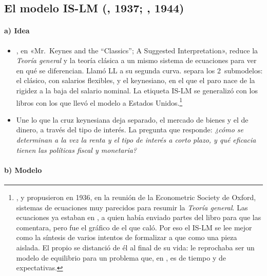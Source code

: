 \documentclass[11pt]{article}
\begin{document}
\subsection{El modelo IS-LM (, 1937; , 1944)}\label{sec:islm}

\paragraph{a) Idea}

\begin{itemize}
\item \textcite{Hicks1937Keynes}, en «Mr.~Keynes and the ``Classics''; A Suggested Interpretation», reduce la \emph{Teoría general} y la teoría clásica a un mismo sistema de ecuaciones para ver en qué se diferencian. Llamó LL a su segunda curva. \textcite{Modigliani1944Liquidity} separa los 2~submodelos: el clásico, con salarios flexibles, y el keynesiano, en el que el paro nace de la rigidez a la baja del salario nominal. La etiqueta IS-LM se generalizó con los libros con los que  llevó el modelo a Estados Unidos\nocite{Hansen1949Monetary,Hansen1953Guide}.\footnote{,  y  propusieron en 1936, en la reunión de la Econometric Society de Oxford, sistemas de ecuaciones muy parecidos para resumir la \emph{Teoría general}\nocite{Harrod1937Keynes,Meade1937Simplified,Hicks1937Keynes}. Las ecuaciones ya estaban en , a quien  había enviado partes del libro para que las comentara, pero fue el gráfico de  el que caló. Por eso el IS-LM se lee mejor como la síntesis de varios intentos de formalizar a  que como una pieza aislada\nocite{Fonseca2026ISLM,Young1987Interpreting}. El propio  se distanció de él al final de su vida: le reprochaba ser un modelo de equilibrio para un problema que, en , es de tiempo y de expectativas\nocite{Hicks1980ISLM}.}
\item Une lo que la cruz keynesiana deja separado, el mercado de bienes y el de dinero, a través del tipo de interés. La pregunta que responde: \emph{¿cómo se determinan a la vez la renta y el tipo de interés a corto plazo, y qué eficacia tienen las políticas fiscal y monetaria?}
\end{itemize}

\paragraph{b) Modelo}
\end{document}
